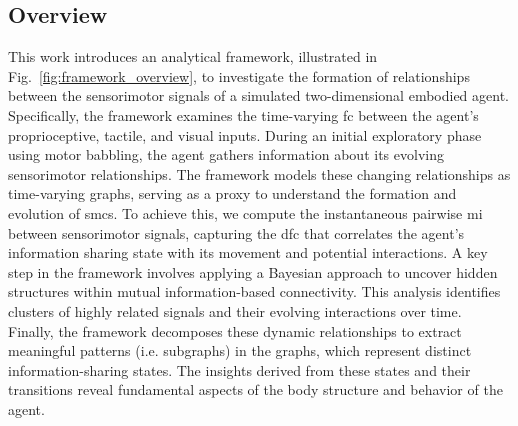 \documentclass[letterpaper, 10 pt, conference]{ieeeconf}  %
\begin{document}
\subsection{Overview}
This work introduces an analytical framework, illustrated in Fig.~\ref{fig:framework_overview}, to investigate the formation of relationships between the sensorimotor signals of a simulated two-dimensional embodied agent. Specifically, the framework examines the time-varying \acl{fc} between the agent's proprioceptive, tactile, and visual inputs. During an initial exploratory phase using motor babbling, the agent gathers information about its evolving sensorimotor relationships. The framework models these changing relationships as time-varying graphs, serving as a proxy to understand the formation and evolution of \acp{smc}. To achieve this, we compute the instantaneous pairwise \ac{mi} between sensorimotor signals, capturing the \acl{dfc} that correlates the agent's information sharing state with its movement and potential interactions. A key step in the framework involves applying a Bayesian approach to uncover hidden structures within mutual information-based connectivity. This analysis identifies clusters of highly related signals and their evolving interactions over time. Finally, the framework decomposes these dynamic relationships to extract meaningful patterns (i.e. subgraphs) in the graphs, which represent distinct information-sharing states. The insights derived from these states and their transitions reveal fundamental aspects of the body structure and behavior of the agent.
\end{document}
